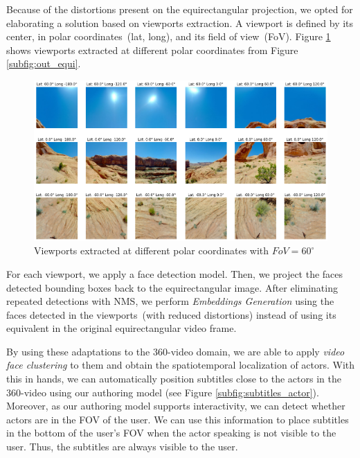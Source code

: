 Because of the distortions present on the equirectangular projection, we opted for elaborating a solution based on viewports extraction. A viewport is defined by its center, in polar coordinates~(lat, long), and its field of view~(FoV). Figure \ref{fig:viewports} shows viewports extracted at different polar coordinates from Figure \ref{subfig:out_equi}.
\begin{figure}[!ht]
    \centering
    \includegraphics[width=1\textwidth]{img/viewports.png}
    \caption{Viewports extracted at different polar coordinates with $FoV = 60^{\circ}$}
    \label{fig:viewports}
\end{figure}
For each viewport, we apply a face detection model. 
Then, we project the faces detected bounding boxes back to the equirectangular image. 
After eliminating repeated detections with NMS, we perform \emph{Embeddings Generation} using the faces detected in the viewports~(with reduced distortions) instead of using its equivalent in the original equirectangular video frame.

By using these adaptations to the 360-video domain, we are able to apply \emph{video face clustering} to them and obtain the spatiotemporal localization of actors. With this in hands, we can automatically position subtitles close to the actors in the 360-video using our authoring model (see Figure \ref{subfig:subtitles_actor}). Moreover, as our authoring model supports interactivity, we can detect whether actors are in the FOV of the user. We can use this information to place subtitles in the bottom of the user's FOV when the actor speaking is not visible to the user. Thus, the subtitles are always visible to the user.


